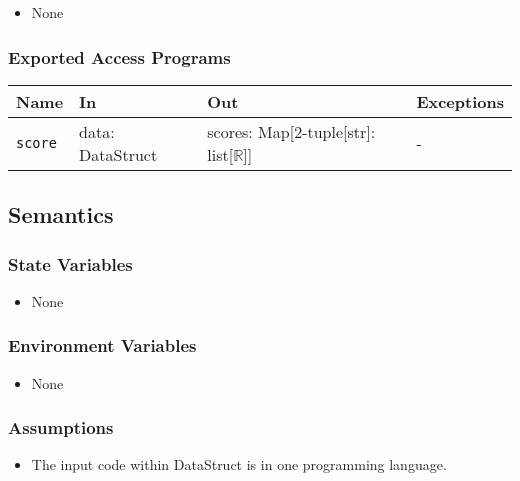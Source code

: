 \documentclass[12pt, titlepage]{article}
\begin{document}
\begin{itemize}
    \item None
\end{itemize}

\subsubsection{Exported Access Programs}

\begin{center}
\begin{tabular}{p{5cm} p{3.5cm} p{3.5cm} p{2cm}}
\hline
\textbf{Name} & \textbf{In} & \textbf{Out} & \textbf{Exceptions} \\
\hline
\texttt{score} & data: DataStruct & scores: Map[2-tuple[str]: list[$\mathbb{R}$]] & - \\ %
\hline
\end{tabular}
\end{center}

\subsection{Semantics}

\subsubsection{State Variables}

\begin{itemize}
    \item None
\end{itemize}

\subsubsection{Environment Variables}

\begin{itemize}
  \item None
\end{itemize}

\subsubsection{Assumptions}

\begin{itemize}
    \item The input code within DataStruct is in one programming language.
\end{itemize}
\end{document}
